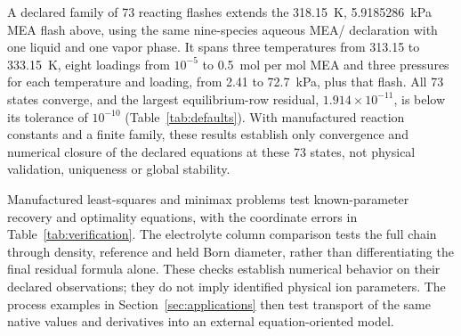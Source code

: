 A declared family of 73 reacting flashes extends the 318.15~K, 5.9185286~kPa MEA flash above, using the same nine-species aqueous MEA/ declaration with one liquid and one vapor phase.
It spans three temperatures from 313.15 to 333.15~K, eight  loadings from $10^{-5}$ to 0.5~mol per mol MEA and three pressures for each temperature and loading, from 2.41 to 72.7~kPa, plus that flash.
All 73 states converge, and the largest equilibrium-row residual, $1.914\times10^{-11}$, is below its tolerance of $10^{-10}$ (Table~\ref{tab:defaults}).
With manufactured reaction constants and a finite family, these results establish only convergence and numerical closure of the declared equations at these 73 states, not physical validation, uniqueness or global stability.

Manufactured least-squares and minimax problems test known-parameter recovery and optimality equations, with the coordinate errors in Table~\ref{tab:verification}.
The electrolyte column comparison tests the full chain through density, reference and held Born diameter, rather than differentiating the final residual formula alone.
These checks establish numerical behavior on their declared observations; they do not imply identified physical ion parameters.
The process examples in Section~\ref{sec:applications} then test transport of the same native values and derivatives into an external equation-oriented model.
